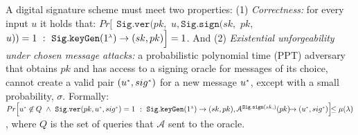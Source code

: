 \vspace{-1mm}
A digital signature scheme must meet two properties: (1) \textit{Correctness:} for every input $u$ it holds that:
%
$Pr\Big[\  \  \mathtt{Sig.ver}( pk, $ $u, \mathtt{Sig.sign}(sk,$ $ pk,$ $ u))=1\ : \
\mathtt{Sig.keyGen}(1^{\scriptscriptstyle \lambda})\rightarrow (sk, pk)  \Big]=1$. And 
%
(2) \textit{Existential unforgeability under chosen message attacks:} a probabilistic polynomial time (PPT) adversary that obtains $pk$ and has access to a signing oracle for messages of its choice, cannot create a valid pair $(u^{\scriptscriptstyle *},sig^{\scriptscriptstyle *})$ for a new message $u^{\scriptscriptstyle *}$, except with a small probability, $\sigma$. Formally: 
%
%
{\small{
$ Pr\Big[
 u^{\st *}\not\in Q\ \wedge \
   \mathtt{Sig.ver}( pk,  u^{\st *}, sig^{\st *}) =1\ : \ 
% 
    \mathtt{Sig.keyGen}(1^{\st \lambda})\rightarrow (sk, pk),
  \mathcal{A}^{\mathtt{Sig.sign}(sk,)}(pk)\lhs\rightarrow(u^{\st *}, sig^{\st *}) 
   \Big]\lhs\leq \mu(\lambda)$}},
where $Q$ is the set of queries that $\mathcal{A}$ sent to the oracle.







